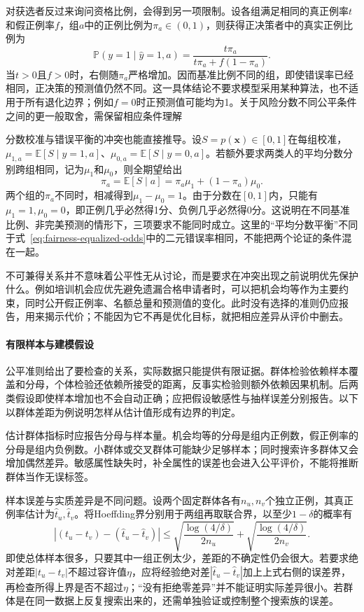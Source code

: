 对获选者反过来询问资格比例，会得到另一项限制。设各组满足相同的真正例率$t$和假正例率$f$，组$a$中的正例比例为$\pi_a\in(0,1)$，则获得正决策者中的真实正例比例为
\begin{equation}
 \mathbb P(y=1\mid\hat y=1,a)
 =\frac{t\pi_a}{t\pi_a+f(1-\pi_a)}.
 \label{eq:fairness-predictive-value}
\end{equation}
当$t>0$且$f>0$时，右侧随$\pi_a$严格增加。因而基准比例不同的组，即使错误率已经相同，正决策的预测值仍然不同。这一具体结论不要求模型采用某种算法，也不适用于所有退化边界；例如$f=0$时正预测值可能均为1。关于风险分数不同公平条件之间的更一般取舍，需保留相应条件理解

分数校准与错误平衡的冲突也能直接推导。设$S=p(\bm{x})\in[0,1]$在每组校准，$\mu_{1,a}=\mathbb E[S\mid y=1,a]$、$\mu_{0,a}=\mathbb E[S\mid y=0,a]$。若额外要求两类人的平均分数分别跨组相同，记为$\mu_1$和$\mu_0$，则全期望给出
\[
 \pi_a=\mathbb E[S\mid a]
       =\pi_a\mu_1+(1-\pi_a)\mu_0.
\]
两个组的$\pi_a$不同时，相减得到$\mu_1-\mu_0=1$。由于分数在$[0,1]$内，只能有$\mu_1=1,\mu_0=0$，即正例几乎必然得1分、负例几乎必然得0分。这说明在不同基准比例、非完美预测的情形下，三项要求不能同时成立。这里的“平均分数平衡”不同于式~\eqref{eq:fairness-equalized-odds}中的二元错误率相同，不能把两个论证的条件混在一起。

不可兼得关系并不意味着公平性无从讨论，而是要求在冲突出现之前说明优先保护什么。例如培训机会应优先避免遗漏合格申请者时，可以把机会均等作为主要约束，同时公开假正例率、名额总量和预测值的变化。此时没有选择的准则仍应报告，用来揭示代价；不能因为它不再是优化目标，就把相应差异从评价中删去。

\paragraph{有限样本与建模假设}

公平准则给出了要检查的关系，实际数据只能提供有限证据。群体检验依赖样本覆盖和分母，个体检验还依赖所接受的距离，反事实检验则额外依赖因果机制。后两类假设即使样本增加也不会自动正确；应把假设敏感性与抽样误差分别报告。以下以群体差距为例说明怎样从估计值形成有边界的判定。

估计群体指标时应报告分母与样本量。机会均等的分母是组内正例数，假正例率的分母是组内负例数。小群体或交叉群体可能缺少足够样本；同时搜索许多群体又会增加偶然差异。敏感属性缺失时，补全属性的误差也会进入公平评价，不能将推断群体当作无误标签。

样本误差与实质差异是不同问题。设两个固定群体各有$n_u,n_v$个独立正例，其真正例率估计为$\hat t_u,\hat t_v$。将Hoeffding界分别用于两组再取联合界，以至少$1-\delta$的概率有
\[
 |(t_u-t_v)-(\hat t_u-\hat t_v)|
 \leq
 \sqrt{\frac{\log(4/\delta)}{2n_u}}
 +\sqrt{\frac{\log(4/\delta)}{2n_v}}.
\]
即使总体样本很多，只要其中一组正例太少，差距的不确定性仍会很大。若要求绝对差距$|t_u-t_v|$不超过容许值$\eta$，应将经验绝对差$|\hat t_u-\hat t_v|$加上上式右侧的误差界，再检查所得上界是否不超过$\eta$；“没有拒绝零差异”并不能证明实际差异很小。若群体是在同一数据上反复搜索出来的，还需单独验证或控制整个搜索族的误差。

